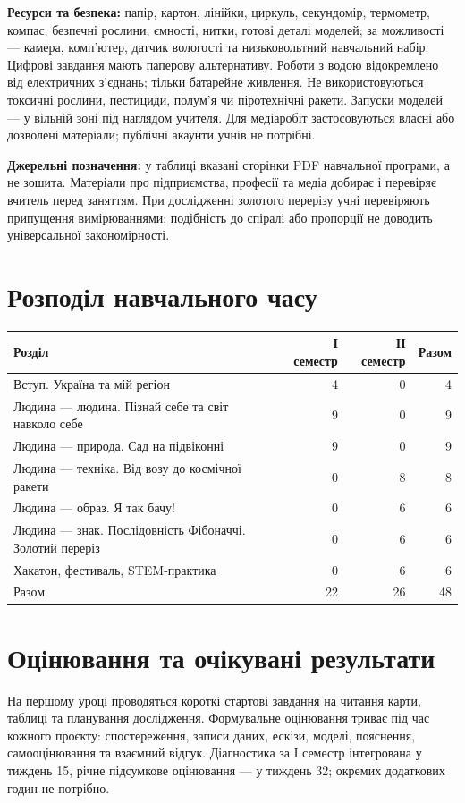 \documentclass[10pt,a4paper,landscape]{article}
\begin{document}
\textbf{Ресурси та безпека:} папір, картон, лінійки, циркуль, секундомір, термометр, компас, безпечні рослини, ємності, нитки, готові деталі моделей; за можливості — камера, комп’ютер, датчик вологості та низьковольтний навчальний набір. Цифрові завдання мають паперову альтернативу. Роботи з водою відокремлено від електричних з’єднань; тільки батарейне живлення. Не використовуються токсичні рослини, пестициди, полум’я чи піротехнічні ракети. Запуски моделей — у вільній зоні під наглядом учителя. Для медіаробіт застосовуються власні або дозволені матеріали; публічні акаунти учнів не потрібні.

\textbf{Джерельні позначення:} у таблиці вказані сторінки PDF навчальної програми, а не зошита. Матеріали про підприємства, професії та медіа добирає і перевіряє вчитель перед заняттям. При дослідженні золотого перерізу учні перевіряють припущення вимірюваннями; подібність до спіралі або пропорції не доводить універсальної закономірності.
\newpage
\section*{Розподіл навчального часу}
\begin{tabular}{P{155mm}rrr}
\toprule Розділ & І семестр & ІІ семестр & Разом \\\midrule
Вступ. Україна та мій регіон & 4 & 0 & 4 \\
Людина — людина. Пізнай себе та світ навколо себе & 9 & 0 & 9 \\
Людина — природа. Сад на підвіконні & 9 & 0 & 9 \\
Людина — техніка. Від возу до космічної ракети & 0 & 8 & 8 \\
Людина — образ. Я так бачу! & 0 & 6 & 6 \\
Людина — знак. Послідовність Фібоначчі. Золотий переріз & 0 & 6 & 6 \\
Хакатон, фестиваль, STEM-практика & 0 & 6 & 6 \\
\midrule Разом & 22 & 26 & 48 \\
\bottomrule\end{tabular}
\section*{Оцінювання та очікувані результати}
На першому уроці проводяться короткі стартові завдання на читання карти, таблиці та планування дослідження. Формувальне оцінювання триває під час кожного проєкту: спостереження, записи даних, ескізи, моделі, пояснення, самооцінювання та взаємний відгук. Діагностика за І семестр інтегрована у тиждень 15, річне підсумкове оцінювання — у тиждень 32; окремих додаткових годин не потрібно.
\end{document}
